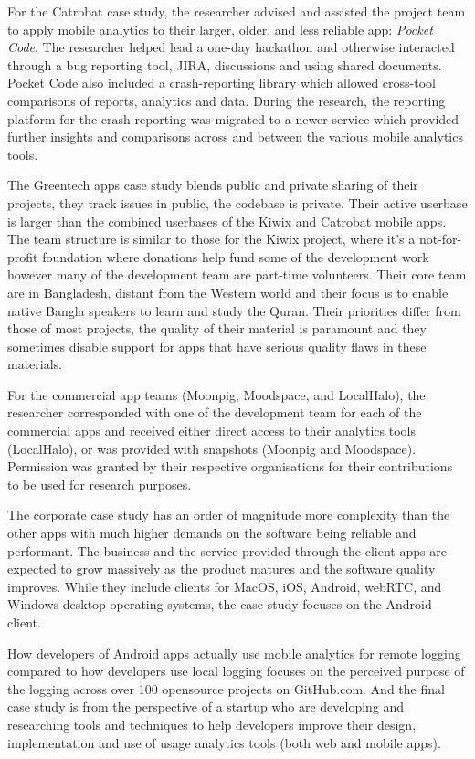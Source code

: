 For the Catrobat case study, the researcher advised and assisted the project team to apply mobile analytics to their larger, older, and less reliable app: \emph{Pocket Code}. The researcher helped lead a one-day hackathon and otherwise interacted through a bug reporting tool, JIRA, discussions and using shared documents. Pocket Code also included a crash-reporting library which allowed cross-tool comparisons of reports, analytics and data. During the research, the reporting platform for the crash-reporting was migrated to a newer service which provided further insights and comparisons across and between the various mobile analytics tools.

The Greentech apps case study blends public and private sharing of their projects, they track issues in public, the codebase is private. Their active userbase is larger than the combined userbases of the Kiwix and Catrobat mobile apps. The team structure is similar to those for the Kiwix project, where it's a not-for-profit foundation where donations help fund some of the development work however many of the development team are part-time volunteers. Their core team are in Bangladesh, distant from the Western world and their focus is to enable native Bangla speakers to learn and study the Quran. Their priorities differ from those of most projects, the quality of their material is paramount and they sometimes disable support for apps that have serious quality flaws in these materials. 

For the commercial app teams (Moonpig, Moodspace, and LocalHalo), the researcher corresponded with one of the development team for each of the commercial apps and received either direct access to their analytics tools (LocalHalo), or was provided with snapshots (Moonpig and Moodspace). Permission was granted by their respective organisations for their contributions to be used for research purposes.

The corporate case study has an order of magnitude more complexity than the other apps with much higher demands on the software being reliable and performant. The business and the service provided through the client apps are expected to grow massively as the product matures and the software quality improves. While they include clients for MacOS, iOS, Android, webRTC, and Windows desktop operating systems, the case study focuses on the Android client.

How developers of Android apps actually use mobile analytics for remote logging compared to how developers use local logging focuses on the perceived purpose of the logging across over 100 opensource projects on GitHub.com. And the final case study is from the perspective of a startup who are developing and researching tools and techniques to help developers improve their design, implementation and use of usage analytics tools (both web and mobile apps). 
\newpage

